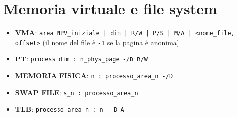 \documentclass[12pt, a4paper]{report}
\begin{document}
\newpage
\section*{Memoria virtuale e file system}

\begin{itemize}
	\item \textbf{VMA}: \texttt{area NPV\_iniziale | dim | R/W | P/S | M/A |
		<nome\_file, offset>}
		(il nome del file è \texttt{-1} se la pagina è anonima)
	\item \textbf{PT}: \texttt{process dim : n\_phys\_page -/D R/W}
	\item \textbf{MEMORIA FISICA}: \texttt{n : processo\_area\_n -/D}
	\item \textbf{SWAP FILE}: \texttt{s\_n : processo\_area\_n}
	\item \textbf{TLB}: \texttt{processo\_area\_n : n - D A}
\end{itemize}
\end{document}
